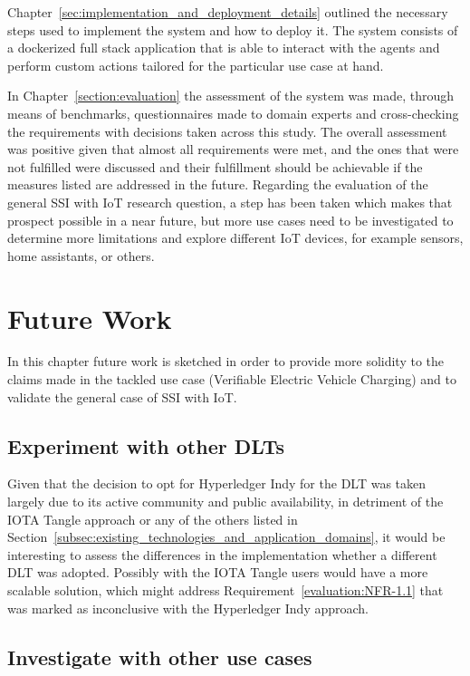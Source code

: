 Chapter~\ref{sec:implementation_and_deployment_details} outlined the necessary steps used to implement the system and how to deploy it. The system consists of a dockerized full stack application that is able to interact with the agents and perform custom actions tailored for the particular use case at hand. 

In Chapter~\ref{section:evaluation} the assessment of the system was made, through means of benchmarks, questionnaires made to domain experts and cross-checking the requirements with decisions taken across this study. The overall assessment was positive given that almost all requirements were met, and the ones that were not fulfilled were discussed and their fulfillment should be achievable if the measures listed are addressed in the future.
Regarding the evaluation of the general SSI with IoT research question, a step has been taken which makes that prospect possible in a near future, but more use cases need to be investigated to determine more limitations and explore different IoT devices, for example sensors, home assistants, or others.

\newpage

\section{Future Work}
\label{subsec:future_work}

In this chapter future work is sketched in order to provide more solidity to the claims made in the tackled use case (Verifiable Electric Vehicle Charging) and to validate the general case of SSI with IoT.

\subsection*{Experiment with other DLTs}
\label{subsubsec:experiment_with_other_dlts}

Given that the decision to opt for Hyperledger Indy for the DLT was taken largely due to its active community and public availability, in detriment of the IOTA Tangle approach or any of the others listed in Section~\ref{subsec:existing_technologies_and_application_domains}, it would be interesting to assess the differences in the implementation whether a different DLT was adopted. Possibly with the IOTA Tangle users would have a more scalable solution, which might address Requirement~\ref{evaluation:NFR-1.1} that was marked as inconclusive with the Hyperledger Indy approach.

\subsection*{Investigate with other use cases}
\label{subsubsec:investigate_with_other_use_cases}

